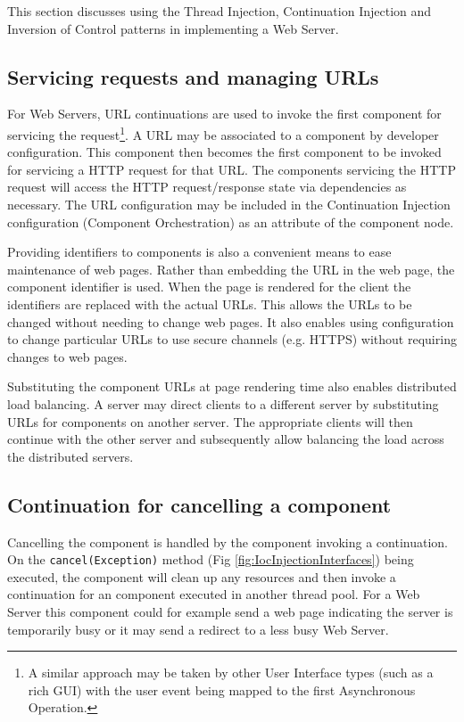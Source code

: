 \documentclass[prodmode]{style/acmlarge}
\begin{document}
This section discusses using the Thread Injection, Continuation Injection and
Inversion of Control patterns in implementing a Web Server.


\subsection{Servicing requests and managing URLs}

For Web Servers, URL continuations \cite{url-continuation} are used to invoke
the first component for servicing the request\footnote{A similar approach may be
taken by other User Interface types (such as a rich GUI) with the user event
being mapped to the first Asynchronous Operation.}.  A URL may be associated to
a component by developer configuration.  This component then becomes the first
component to be invoked for servicing a HTTP request for that URL.  The
components servicing the HTTP request will access the HTTP request/response
state via dependencies as necessary.  The URL configuration may be included in the
Continuation Injection configuration (Component Orchestration) as an attribute
of the component node.

Providing identifiers to components is also a convenient means to
ease maintenance of web pages.  Rather than embedding the URL in the web page,
the component identifier is used.  When the page is rendered for
the client the identifiers are replaced with the actual URLs.  This allows the
URLs to be changed without needing to change web pages.  It also enables using
configuration to change particular URLs to use secure channels (e.g. HTTPS)
without requiring changes to web pages.

Substituting the component URLs at page rendering time also enables distributed
load balancing.  A server may direct clients to a different server by
substituting URLs for components on another server. The appropriate clients will
then continue with the other server and subsequently allow balancing the load
across the distributed servers.


\subsection{Continuation for cancelling a component}

Cancelling the component is handled by the component invoking a continuation.
On the \texttt{cancel(Exception)} method (Fig \ref{fig:IocInjectionInterfaces})
being executed, the component will clean up any resources and then invoke a
continuation for an component executed in another thread pool.  For a Web Server
this component could for example send a web page indicating the server is
temporarily busy or it may send a redirect to a less busy Web Server.
\end{document}
